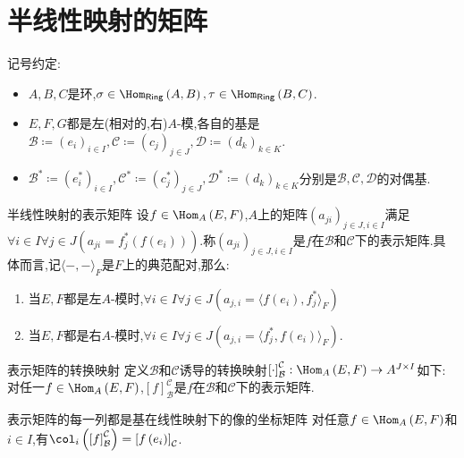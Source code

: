 \section{半线性映射的矩阵}

记号约定:

\begin{itemize}
	\item $A,B,C$是环,$\sigma\in\Hom_{\mathsf{Ring}}\left(A,B\right),\tau\in\Hom_{\mathsf{Ring}}\left(B,C\right)$.
	\item $E,F,G$都是左(相对的,右)$A$-模,各自的基是$\mathcal{B}\coloneq\left(e_{i}\right)_{i\in I},\mathcal{C}\coloneq\left(c_{j}\right)_{j\in J},\mathcal{D}\coloneq\left(d_{k}\right)_{k\in K}$.
	\item $\mathcal{B}^{\ast}\coloneq\left(e_{i}^{\ast}\right)_{i\in I},\mathcal{C}^{\ast}\coloneq\left(c_{j}^{\ast}\right)_{j\in J},\mathcal{D}^{\ast}\coloneq\left(d_{k}\right)_{k\in K}$分别是$\mathcal{B},\mathcal{C},\mathcal{D}$的对偶基.
\end{itemize}

\begin{definition}{半线性映射的表示矩阵}{}
	设$f\in\Hom_{A}\left(E,F\right)$,$A$上的矩阵$\left(a_{ji}\right)_{j\in J,i\in I}$满足$\forall i\in I\forall j\in J\left(a_{ji}=f_{j}^{\ast}\left(f\left(e_{i}\right)\right)\right)$.称$\left(a_{ji}\right)_{j\in J,i\in I}$是$f$在$\mathcal{B}$和$\mathcal{C}$下的表示矩阵.具体而言,记$\langle-,-\rangle_{F}$是$F$上的典范配对,那么:
	\begin{enumerate}
		\item 当$E,F$都是左$A$-模时,$\forall i\in I\forall j\in J\left(a_{j,i}=\langle f\left(e_{i}\right),f_{j}^{\ast}\rangle_{F}\right)$
		\item 当$E,F$都是右$A$-模时,$\forall i\in I\forall j\in J\left(a_{j,i}=\langle f_{j}^{\ast},f\left(e_{i}\right)\rangle_{F}\right)$.
	\end{enumerate}
\end{definition}

\begin{definition}{表示矩阵的转换映射}{}
	定义$\mathcal{B}$和$\mathcal{C}$诱导的转换映射$\left[\cdot\right]_{\mathcal{B}}^{\mathcal{C}}:\Hom_{A}\left(E,F\right)\to A^{J\times I}$如下:对任一$f\in\Hom_{A}\left(E,F\right)$,$\left[f\right]_{\mathcal{B}}^{\mathcal{C}}$是$f$在$\mathcal{B}$和$\mathcal{C}$下的表示矩阵.
\end{definition}

\begin{remark}{表示矩阵的每一列都是基在线性映射下的像的坐标矩阵}{}
	对任意$f\in\Hom_{A}\left(E,F\right)$和$i\in I$,有$\col_{i}\left(\left[f\right]_{\mathcal{B}}^{\mathcal{C}}\right)=\left[f\left(e_{i}\right)\right]_{\mathcal{C}}$.
\end{remark}

